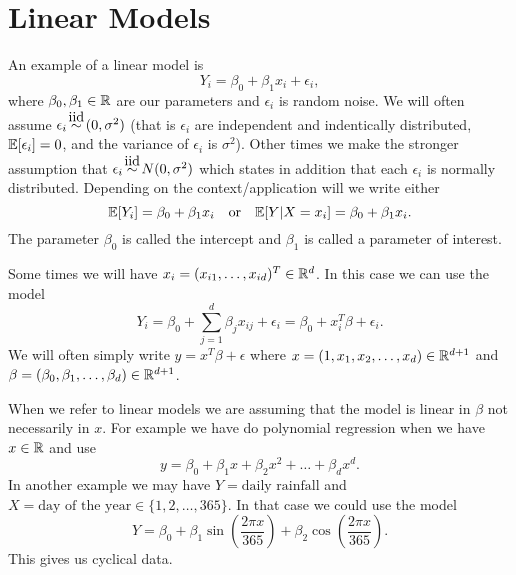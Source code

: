 \section{Linear Models}
An example of a linear model is
\[Y_i = \beta_0+\beta_1x_i + \epsilon_i, \]
where $\beta_0,\beta_1 \in {\mathbb R}$ are our parameters and $\epsilon_i$ is random noise. We will often assume $\epsilon_i \iid (0,\sigma^2)$ (that is $\epsilon_i$ are independent and indentically distributed, ${\mathbb{E}}[\epsilon_i]=0$, and the variance of $\epsilon_i$ is $\sigma^2$). Other times we make the stronger assumption that $\epsilon_i \iid N(0,\sigma^2)$ which states in addition that each $\epsilon_i$ is normally distributed. Depending on the context/application will we write either
\[{\mathbb{E}}[Y_i] = \beta_0+\beta_1x_i \quad \text{or} \quad {\mathbb{E}}[Y|X=x_i] = \beta_0 +\beta_1x_i. \]
The parameter $\beta_0$ is called the intercept and $\beta_1$ is called a parameter of interest.

Some times we will have $x_i = (x_{i1},\ldots, x_{id})^T \in {\mathbb R}^d$. In this case we can use the model 
\[Y_i = \beta_0 + \sum_{j=1}^d\beta_j x_{ij} + \epsilon_i = \beta_0 + x_i^T\beta+\epsilon_i. \]
We will often simply write $y=x^T\beta + \epsilon$ where $x = (1,x_1,x_2,\ldots,x_d) \in {\mathbb R}^{d+1}$ and $\beta = (\beta_0,\beta_1,\ldots,\beta_d) \in {\mathbb R}^{d+1}$.

When we refer to linear models we are assuming that the model is linear in $\beta$ not necessarily in $x$. For example we have do polynomial regression when we have $x \in {\mathbb R}$ and use
\[y = \beta_0 +\beta_1x+\beta_2x^2+\ldots +\beta_dx^d.\] 
In another example we may have $Y = \text{daily rainfall}$ and $X = \text{day of the year} \in \{1,2,\ldots,365\}$. In that case we could use the model
\[Y = \beta_0 +\beta_1\sin\left(\frac{2\pi x}{365}\right)+\beta_2\cos\left(\frac{2\pi x}{365}\right). \]
This gives us cyclical data.

